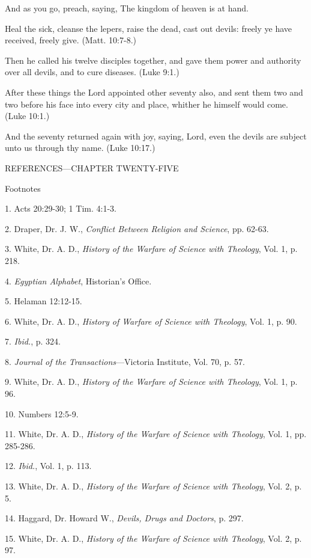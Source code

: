 And as you go, preach, saying, The kingdom of heaven is at hand.

Heal the sick, cleanse the lepers, raise the dead, cast out devils: freely ye have received,
freely give. (Matt. 10:7-8.)

Then he called his twelve disciples together, and gave them power and authority over all
devils, and to cure diseases. (Luke 9:1.)

After these things the Lord appointed other seventy also, and sent them two and two before
his face into every city and place, whither he himself would come. (Luke 10:1.)

And the seventy returned again with joy, saying, Lord, even the devils are subject unto us
through thy name. (Luke 10:17.)

\newpage
REFERENCES—CHAPTER TWENTY-FIVE

Footnotes

1. Acts 20:29-30; 1 Tim. 4:1-3.

2. Draper, Dr. J. W., \textit{Conflict Between Religion and Science}, pp. 62-63.

3. White, Dr. A. D., \textit{History of the Warfare of Science with Theology}, Vol. 1, p. 218.

4. \textit{Egyptian Alphabet}, Historian's Office.

5. Helaman 12:12-15.

6. White, Dr. A. D., \textit{History of Warfare of Science with Theology}, Vol. 1, p. 90.

7. \textit{Ibid.}, p. 324.

8. \textit{Journal of the Transactions}—Victoria Institute, Vol. 70, p. 57.

9. White, Dr. A. D., \textit{History of the Warfare of Science with Theology}, Vol. 1, p. 96.

10. Numbers 12:5-9.

11. White, Dr. A. D., \textit{History of the Warfare of Science with Theology}, Vol. 1, pp. 285-286.

12. \textit{Ibid.}, Vol. 1, p. 113.

13. White, Dr. A. D., \textit{History of the Warfare of Science with Theology}, Vol. 2, p. 5.

14. Haggard, Dr. Howard W., \textit{Devils, Drugs and Doctors}, p. 297.

15. White, Dr. A. D., \textit{History of the Warfare of Science with Theology}, Vol. 2, p. 97.

